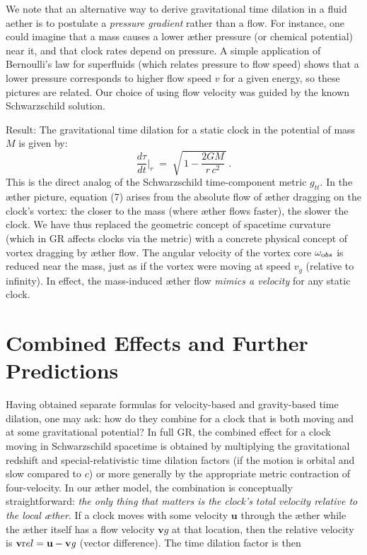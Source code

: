 \documentclass[aps,preprint,superscriptaddress]{revtex4}
\begin{document}
We note that an alternative way to derive gravitational time dilation in a fluid aether is to postulate a \textit{pressure gradient} rather than a flow. For instance, one could imagine that a mass causes a lower æther pressure (or chemical potential) near it, and that clock rates depend on pressure. A simple application of Bernoulli’s law for superfluids (which relates pressure to flow speed) shows that a lower pressure corresponds to higher flow speed $v$ for a given energy, so these pictures are related. Our choice of using flow velocity was guided by the known Schwarzschild solution.


Result: The gravitational time dilation for a static clock in the potential of mass $M$ is given by:
\begin{equation}
\boxed{\frac{d\tau}{dt}\Big|_{r} \;=\; \sqrt{\,1-\frac{2GM}{r\,c^2}\,}\,.} \tag{7}
\end{equation}
This is the direct analog of the Schwarzschild time-component metric $g_{tt}$. In the æther picture, equation (7) arises from the absolute flow of æther dragging on the clock’s vortex: the closer to the mass (where æther flows faster), the slower the clock. We have thus replaced the geometric concept of spacetime curvature (which in GR affects clocks via the metric) with a concrete physical concept of vortex dragging by æther flow. The angular velocity of the vortex core $\omega_{\textrm obs}$ is reduced near the mass, just as if the vortex were moving at speed $v_g$ (relative to infinity). In effect, the mass-induced æther flow \textit{mimics a velocity} for any static clock.


\section*{Combined Effects and Further Predictions}

Having obtained separate formulas for velocity-based and gravity-based time dilation, one may ask: how do they combine for a clock that is both moving and at some gravitational potential? In full GR, the combined effect for a clock moving in Schwarzschild spacetime is obtained by multiplying the gravitational redshift and special-relativistic time dilation factors (if the motion is orbital and slow compared to $c$) or more generally by the appropriate metric contraction of four-velocity. In our æther model, the combination is conceptually straightforward: \textit{the only thing that matters is the clock’s total velocity relative to the local æther}. If a clock moves with some velocity $\mathbf{u}$ through the æther while the æther itself has a flow velocity $\mathbf{v}\textit{g}$ at that location, then the relative velocity is $\mathbf{v}{\textrm rel} = \mathbf{u} - \mathbf{v}\textit{g}$ (vector difference). The time dilation factor is then
\end{document}
